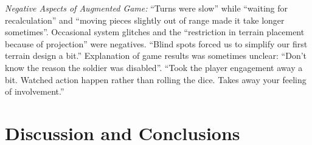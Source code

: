 \documentclass[10pt,twocolumn,letterpaper]{article}
\begin{document}
{\em Negative Aspects of Augmented Game:} %
%
%
%
%
``Turns were slow'' while ``waiting for recalculation'' and
  ``moving pieces slightly out of range made it take longer
  sometimes''. 
%
%
Occasional system glitches and the ``restriction in terrain placement because of projection'' were negatives.
``Blind spots forced us to simplify our first terrain design a bit.''
Explanation of game results was sometimes unclear:
``Don't know the reason the soldier was disabled''.
%
``Took the player engagement away a bit.  Watched action happen rather
than rolling the dice.  Takes away your feeling of involvement.''


%
%
%
%


\section{Discussion and Conclusions}
\end{document}
